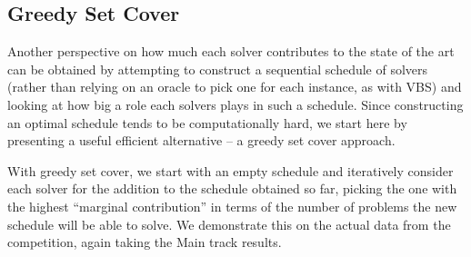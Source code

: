 \documentclass{elsarticle}
\begin{document}
\subsection{Greedy Set Cover}
Another perspective on how much each solver contributes to the state of the art
can be obtained by attempting to construct a sequential schedule of solvers 
(rather than relying on an oracle to pick one for each instance, as with VBS)
and looking at how big a role each solvers plays in such a schedule. Since constructing 
an optimal schedule tends to be computationally hard, we start here by 
presenting a useful efficient alternative -- a greedy set cover approach.

With greedy set cover, we start with an empty schedule and iteratively consider 
each solver for the addition to the schedule obtained so far, picking the one
with the highest ``marginal contribution'' in terms of the number of problems
the new schedule will be able to solve. We demonstrate this on
the actual data from the competition, again taking the Main track results. 
\end{document}
